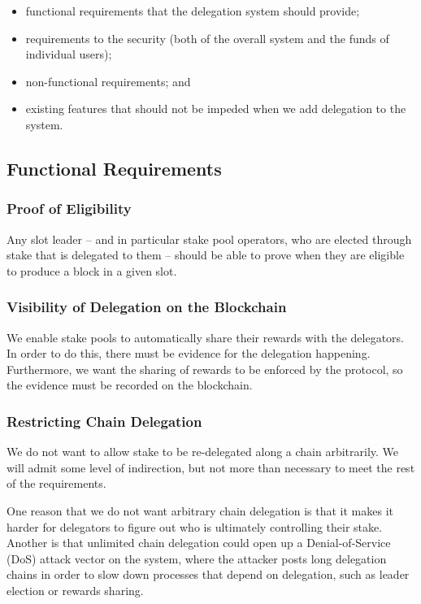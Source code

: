 \documentclass[11pt,a4paper]{article}
\begin{document}
\begin{itemize}
\item
  functional requirements that the delegation system should provide;
\item
  requirements to the security (both of the overall system and the funds
  of individual users);
\item
  non-functional requirements; and
\item
  existing features that should not be impeded when we add delegation to
  the system.
\end{itemize}

\subsection{Functional Requirements}\label{functional-requirements}

\subsubsection{Proof of Eligibility}\label{proof-of-eligibility}

Any slot leader -- and in particular stake pool operators, who are
elected through stake that is delegated to them -- should be able to
prove when they are eligible to produce a block in a given slot.

\subsubsection{Visibility of Delegation on the
Blockchain}\label{visibility-of-delegation-on-the-blockchain}

We enable stake pools to automatically share their rewards with the
delegators. In order to do this, there must be evidence for the
delegation happening. Furthermore, we want the sharing of rewards to be
enforced by the protocol, so the evidence must be recorded on the
blockchain.

\subsubsection{Restricting Chain
Delegation}\label{restricting-chain-delegation}

We do not want to allow stake to be re-delegated along a chain
arbitrarily. We will admit some level of indirection, but not more than
necessary to meet the rest of the requirements.

One reason that we do not want arbitrary chain delegation is that it
makes it harder for delegators to figure out who is ultimately
controlling their stake. Another is that unlimited chain delegation
could open up a Denial-of-Service (DoS) attack vector on the system,
where the attacker posts long delegation chains in order to slow down
processes that depend on delegation, such as leader election or rewards
sharing.
\end{document}
